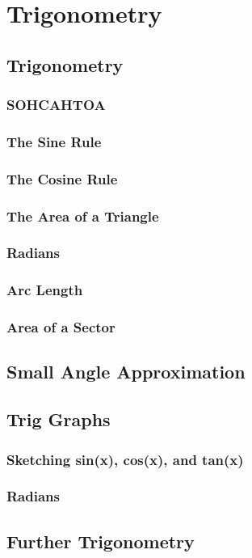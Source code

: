 \documentclass[../maths.tex]{subfiles}
\begin{document}
\chapter{Trigonometry}
\section{Trigonometry}
\subsection*{SOHCAHTOA}
\subsection*{The Sine Rule}
\subsection*{The Cosine Rule}
\subsection*{The Area of a Triangle}
\subsection*{Radians}
\subsection*{Arc Length}
\subsection*{Area of a Sector}
\section{Small Angle Approximation}
\section{Trig Graphs}
\subsection*{Sketching sin(x), cos(x), and tan(x)}
\subsection*{Radians}
\section{Further Trigonometry}
\end{document}
